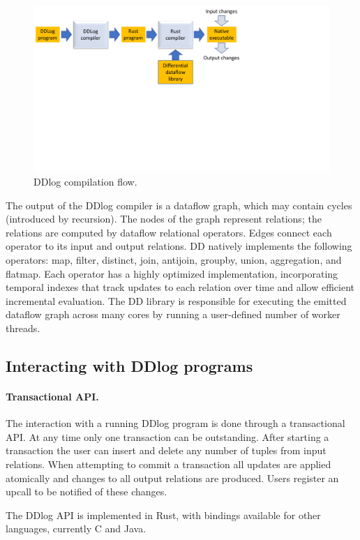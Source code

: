 \begin{figure}
\begin{center}
    \includegraphics[width=.6\columnwidth,clip=true,trim=0in 4in 4in
      0in]{compiler-flow.pdf}
\end{center}
    \caption{DDlog compilation flow.\label{fig:compiler-flow}}
\end{figure}

The output of the DDlog compiler is a dataflow graph, which may
contain cycles (introduced by recursion).  The nodes of the graph
represent relations; the relations are computed by dataflow relational
operators.  Edges connect each operator to its input and output
relations.  DD natively implements the following operators: map,
filter, distinct, join, antijoin, groupby, union, aggregation, and
flatmap.  Each operator has a highly optimized implementation,
incorporating temporal indexes that track updates to each relation
over time and allow efficient incremental evaluation.  The DD library
is responsible for executing the emitted dataflow graph across many
cores by running a user-defined number of worker threads.

\subsection{Interacting with DDlog programs}

\paragraph{Transactional API.}
The interaction with a running DDlog program is done through a
transactional API.  At any time only one transaction can be
outstanding.  After starting a transaction the user can insert and
delete any number of tuples from input relations.  When attempting to
commit a transaction all updates are applied atomically and changes to
all output relations are produced.  Users register an upcall to be
notified of these changes.

The DDlog API is implemented in Rust, with bindings available for
other languages, currently C and Java.

